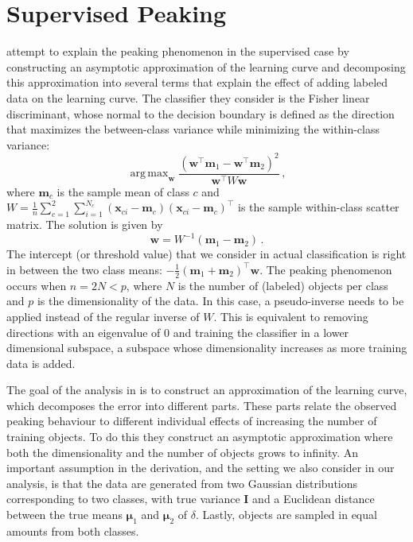 \documentclass[twoside]{memoir}\usepackage[]{graphicx}\usepackage{xcolor}
\renewcommand{\cite}{\citep}
\DeclareMathOperator*{\argmax}{arg\,max}
\renewcommand{\vec}{\mathbf}
\begin{document}
\section{Supervised Peaking} \label{section:supervisedpeaking}
\citet{Raudys1998} attempt to explain the peaking phenomenon in the supervised case by constructing an asymptotic approximation of the learning curve and decomposing this approximation into several terms that explain the effect of adding labeled data on the learning curve. The classifier they consider is the Fisher linear discriminant, whose normal to the decision boundary is defined as the direction that maximizes the between-class variance while minimizing the within-class variance:
\begin{equation} \label{eq:fisherobjective}
\argmax_{\vec{w}} \frac{(\vec{w}^\top \vec{m}_1 - \vec{w}^\top \vec{m}_2)^2}{\vec{w}^\top W \vec{w}} \, ,
\end{equation}
where $\vec{m}_c$ is the sample mean of class $c$ and $W=\tfrac{1}{n} \sum_{c=1}^2 \sum_{i=1}^{N_c} (\vec{x}_{ci} - \vec{m}_c)(\vec{x}_{ci} - \vec{m}_c)^\top$ is the sample within-class scatter matrix. The solution is given by
\begin{equation} \label{eq:Wformulation}
\vec{w} = W^{-1} (\vec{m}_1-\vec{m}_2) \, .
\end{equation}
The intercept (or threshold value) that we consider in actual classification is right in between the two class means:
$-\frac{1}{2}(\vec{m}_1+\vec{m}_2)^\top \vec{w}$.  The peaking phenomenon occurs when $n=2N<p$, where $N$ is the number of (labeled) objects per class and $p$ is the dimensionality of the data. In this case, a pseudo-inverse needs to be applied instead of the regular inverse of $W$. This is equivalent to removing directions with an eigenvalue of $0$ and training the classifier in a lower dimensional subspace, a subspace whose dimensionality increases as more training data is added.

The goal of the analysis in \cite{Raudys1998} is to construct an approximation of the learning curve, which decomposes the error into different parts. These parts relate the observed peaking behaviour to different individual effects of increasing the number of training objects. To do this they construct an asymptotic approximation where both the dimensionality and the number of objects grows to infinity. An important assumption in the derivation, and the setting we also consider in our analysis, is that the data are generated from two Gaussian distributions corresponding to two classes, with true variance $\mathbf{I}$ and a Euclidean distance between the true means $\boldsymbol{\mu}_1$ and $\boldsymbol{\mu}_2$ of $\delta$. Lastly, objects are sampled in equal amounts from both classes.
\end{document}
